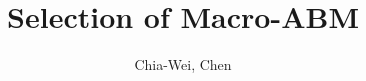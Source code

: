 \documentclass{beamer}
\title{Selection of Macro-ABM}
\author{Chia-Wei, Chen}
\begin{document}
    \begin{frame}
        \maketitle
    \end{frame}

    
    
\end{document}
